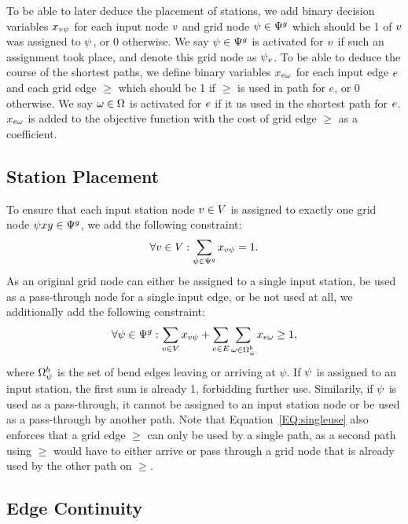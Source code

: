 \documentclass{sig-alternate-sigmod09}
\begin{document}
To be able to later deduce the placement of stations, we add binary decision variables $x_{v\psi}$ for each input node $v$ and grid node $\psi \in \Psi^g$ which should be 1 of $v$ was assigned to $\psi$, or 0 otherwise.
We say $\psi \in \Psi^g$ is activated for $v$ if such an assignment took place, and denote this grid node as $\psi_v$.
To be able to deduce the course of the shortest paths, we define binary variables $x_{e\omega}$ for each input edge $e$ and each grid edge $\ge$ which should be 1 if $\ge$ is used in path for $e$, or 0 otherwise.
We say $\omega \in \Omega$ is activated for $e$ if it us used in the shortest path for $e$.
$x_{e\omega}$ is added to the objective function with the cost of grid edge $\ge$ as a coefficient.

\subsection{Station Placement}

To ensure that each input station node $v \in V$ is assigned to exactly one grid node $\psi{x}{y} \in \Psi^g$, we add the following constraint:
%
\begin{equation}
  \forall v \in V: \sum_{\psi \in \Psi^g} x_{v\psi} = 1. \label{EQ:onegvperiv}
\end{equation}
%
As an original grid node can either be assigned to a single input station, be used as a pass-through node for a single input edge, or be not used at all, we additionally add the following constraint:
%
\begin{equation}
  \forall \psi \in \Psi^g: \sum_{v \in V} x_{v\psi} + \sum_{e \in E} \sum_{\omega \in \Omega^b_\psi} x_{e\omega} \geq 1, \label{EQ:singleuse}
\end{equation}
%
where $\Omega^b_\psi$ is the set of bend edges leaving or arriving at $\psi$. 
If $\psi$ is assigned to an input station, the first sum is already 1, forbidding further use.
Similarily, if $\psi$ is used as a pass-through, it cannot be assigned to an input station node or be used as a pass-through by another path.
Note that Equation~\ref{EQ:singleuse} also enforces that a grid edge $\ge$ can only be used by a single path, as a second path using $\ge$ would have to either arrive or pass through a grid node that is already used by the other path on $\ge$.

\subsection{Edge Continuity}
\end{document}
